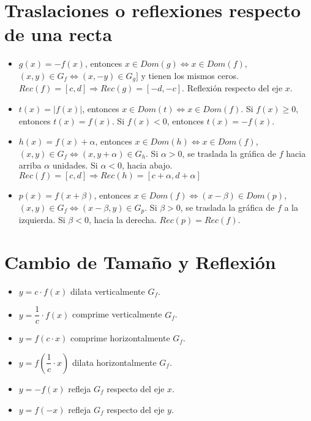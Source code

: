 \documentclass[11pt,a4paper]{article}
\begin{document}
\section{Traslaciones o reflexiones respecto de una recta}
\begin{itemize}
\item $g(x) = -f(x)$, entonces $x \in Dom(g) \iff x \in Dom(f)$, $(x,y) \in G_f \iff (x,-y) \in G_g]$ y tienen los mismos ceros. $Rec(f)=[c,d] \Rightarrow Rec(g)=[-d,-c]$. Reflexi\'on respecto del eje $x$.
\item $t(x)=|f(x)|$, entonces $x \in Dom(t) \iff x \in Dom(f)$. Si $f(x) \geq 0$, entonces $t(x)=f(x)$. Si $f(x) < 0$, entonces $t(x) = -f(x)$.
\item $h(x) = f(x) + \alpha$, entonces $x \in Dom(h) \iff x \in Dom(f)$, $(x,y) \in G_f \iff (x,y+\alpha )\in G_h$. Si $\alpha > 0$, se traslada la gr\'afica de $f$ hacia arriba $\alpha$ unidades. Si $\alpha < 0$, hacia abajo.\\ $Rec(f)=[c,d] \Rightarrow Rec(h) = [c+\alpha, d+\alpha]$
\item $p(x) = f(x + \beta)$, entonces $x \in Dom(f) \iff (x-\beta )\in Dom(p)$, $(x,y) \in G_f \iff (x-\beta, y) \in G_p$. Si $\beta > 0$, se traslada la gr\'afica de $f$ a la izquierda. Si $\beta < 0$, hacia la derecha. $Rec(p) = Rec(f)$.
\end{itemize}

\section{Cambio de Tama\~no y Reflexi\'on}
\begin{multicols}{2}
\begin{itemize}
\item $y = c \cdot f(x)$ dilata verticalmente $G_f$.
\item $y = \dfrac{1}{c} \cdot f(x)$ comprime verticalmente $G_f$.
\item $y = f(c \cdot x)$ comprime horizontalmente $G_f$.
\item $y = f\left(\dfrac{1}{c} \cdot x\right)$ dilata horizontalmente $G_f$.
\item $y = - f(x)$ refleja $G_f$ respecto del eje $x$.
\item $y = f(-x)$ refleja $G_f$ respecto del eje $y$.\\ \\ \\ \\
\end{itemize}
\end{multicols}
\end{document}
